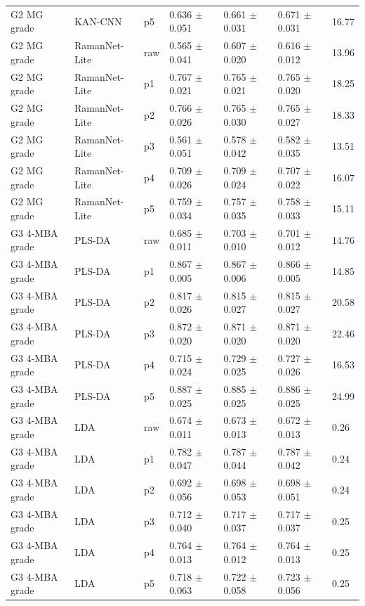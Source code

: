 {\begin{longtable}{L{2.35cm}L{2.4cm}L{1.0cm}L{2.35cm}L{2.25cm}L{2.25cm}L{1.45cm}}
G2 MG grade & KAN-CNN & p5 & 0.636 $\pm$ 0.051 & 0.661 $\pm$ 0.031 & 0.671 $\pm$ 0.031 & 16.77 \\
G2 MG grade & RamanNet-Lite & raw & 0.565 $\pm$ 0.041 & 0.607 $\pm$ 0.020 & 0.616 $\pm$ 0.012 & 13.96 \\
G2 MG grade & RamanNet-Lite & p1 & 0.767 $\pm$ 0.021 & 0.765 $\pm$ 0.021 & 0.765 $\pm$ 0.020 & 18.25 \\
G2 MG grade & RamanNet-Lite & p2 & 0.766 $\pm$ 0.026 & 0.765 $\pm$ 0.030 & 0.765 $\pm$ 0.027 & 18.33 \\
G2 MG grade & RamanNet-Lite & p3 & 0.561 $\pm$ 0.051 & 0.578 $\pm$ 0.042 & 0.582 $\pm$ 0.035 & 13.51 \\
G2 MG grade & RamanNet-Lite & p4 & 0.709 $\pm$ 0.026 & 0.709 $\pm$ 0.024 & 0.707 $\pm$ 0.022 & 16.07 \\
G2 MG grade & RamanNet-Lite & p5 & 0.759 $\pm$ 0.034 & 0.757 $\pm$ 0.035 & 0.758 $\pm$ 0.033 & 15.11 \\
G3 4-MBA grade & PLS-DA & raw & 0.685 $\pm$ 0.011 & 0.703 $\pm$ 0.010 & 0.701 $\pm$ 0.012 & 14.76 \\
G3 4-MBA grade & PLS-DA & p1 & 0.867 $\pm$ 0.005 & 0.867 $\pm$ 0.006 & 0.866 $\pm$ 0.005 & 14.85 \\
G3 4-MBA grade & PLS-DA & p2 & 0.817 $\pm$ 0.026 & 0.815 $\pm$ 0.027 & 0.815 $\pm$ 0.027 & 20.58 \\
G3 4-MBA grade & PLS-DA & p3 & 0.872 $\pm$ 0.020 & 0.871 $\pm$ 0.020 & 0.871 $\pm$ 0.020 & 22.46 \\
G3 4-MBA grade & PLS-DA & p4 & 0.715 $\pm$ 0.024 & 0.729 $\pm$ 0.025 & 0.727 $\pm$ 0.026 & 16.53 \\
G3 4-MBA grade & PLS-DA & p5 & 0.887 $\pm$ 0.025 & 0.885 $\pm$ 0.025 & 0.886 $\pm$ 0.025 & 24.99 \\
G3 4-MBA grade & LDA & raw & 0.674 $\pm$ 0.011 & 0.673 $\pm$ 0.013 & 0.672 $\pm$ 0.013 & 0.26 \\
G3 4-MBA grade & LDA & p1 & 0.782 $\pm$ 0.047 & 0.787 $\pm$ 0.044 & 0.787 $\pm$ 0.042 & 0.24 \\
G3 4-MBA grade & LDA & p2 & 0.692 $\pm$ 0.056 & 0.698 $\pm$ 0.053 & 0.698 $\pm$ 0.051 & 0.24 \\
G3 4-MBA grade & LDA & p3 & 0.712 $\pm$ 0.040 & 0.717 $\pm$ 0.037 & 0.717 $\pm$ 0.037 & 0.25 \\
G3 4-MBA grade & LDA & p4 & 0.764 $\pm$ 0.013 & 0.764 $\pm$ 0.012 & 0.764 $\pm$ 0.013 & 0.25 \\
G3 4-MBA grade & LDA & p5 & 0.718 $\pm$ 0.063 & 0.722 $\pm$ 0.058 & 0.723 $\pm$ 0.056 & 0.25 \\

\end{longtable}}
